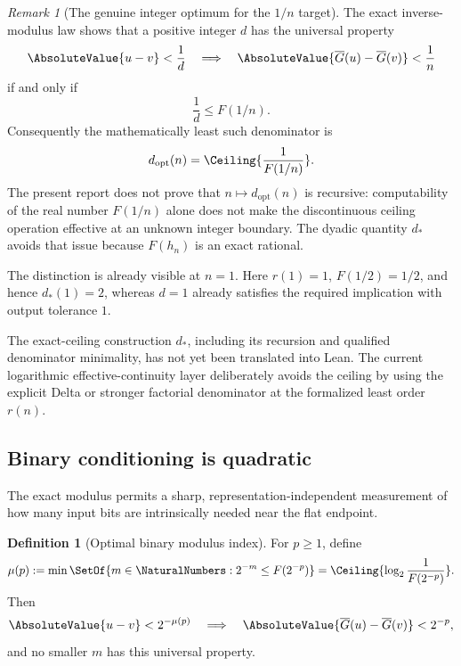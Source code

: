 \documentclass[11pt,oneside]{article}
\theoremstyle{definition}
\newtheorem{definition}[theorem]{Definition}
\theoremstyle{remark}
\newtheorem{remark}[theorem]{Remark}
\numberwithin{equation}{section}
\newcommand{\InvT}{\overline G}
\begin{document}
\begin{remark}[The genuine integer optimum for the $1/n$ target]
The exact inverse-modulus law shows that a positive integer $d$ has the
universal property
\[
 \AbsoluteValue{u-v}<\frac1d
 \quad\Longrightarrow\quad
 \AbsoluteValue{\InvT(u)-\InvT(v)}<\frac1n
\]
if and only if
\[
 \frac1d\le F(1/n).
\]
Consequently the mathematically least such denominator is
\[
 d_{\mathrm{opt}}(n)=\Ceiling{\frac1{F(1/n)}}.
\]
The present report does not prove that $n\mapsto d_{\mathrm{opt}}(n)$ is
recursive: computability of the real number $F(1/n)$ alone does not make the
discontinuous ceiling operation effective at an unknown integer boundary.
The dyadic quantity $d_*$ avoids that issue because $F(h_n)$ is an exact
rational.

The distinction is already visible at $n=1$.  Here $r(1)=1$,
$F(1/2)=1/2$, and hence $d_*(1)=2$, whereas $d=1$ already satisfies the
required implication with output tolerance $1$.
\end{remark}

The exact-ceiling construction $d_*$, including its recursion and qualified
denominator minimality, has not yet been translated into Lean.  The current
logarithmic effective-continuity layer deliberately avoids the ceiling by
using the explicit Delta or stronger factorial denominator at the formalized
least order $r(n)$.

\subsection{Binary conditioning is quadratic}
\label{sec:binary-conditioning}

The exact modulus permits a sharp, representation-independent measurement of
how many input bits are intrinsically needed near the flat endpoint.

\begin{definition}[Optimal binary modulus index]\label{def:mu}
For $p\ge1$, define
\begin{equation}\label{eq:mu-def}
 \mu(p):=\min\SetOf{m\in\NaturalNumbers:2^{-m}\le F(2^{-p})}
 =\Ceiling{\log_2\frac1{F(2^{-p})}}.
\end{equation}
Then
\begin{equation}\label{eq:mu-property}
 \AbsoluteValue{u-v}<2^{-\mu(p)}
 \quad\Longrightarrow\quad
 \AbsoluteValue{\InvT(u)-\InvT(v)}<2^{-p},
\end{equation}
and no smaller $m$ has this universal property.
\end{definition}
\end{document}
